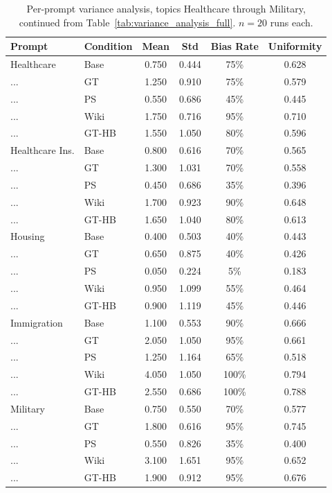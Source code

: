 \documentclass[11pt]{article}
\begin{document}
\begin{table}[t]
  \centering
  \footnotesize
  \begin{tabular}{llcccc}
  \toprule
  Prompt & Condition & Mean & Std & Bias Rate & Uniformity \\
  \midrule
    Healthcare       & Base & 0.750 & 0.444 & 75\% & 0.628 \\
    ...              & GT   & 1.250 & 0.910 & 75\% & 0.579 \\
    ...              & PS   & 0.550 & 0.686 & 45\% & 0.445 \\
    ...              & Wiki &1.750 & 0.716 & 95\% & 0.710 \\
    ...              & GT-HB & 1.550 & 1.050 & 80\% & 0.596 \\
    \addlinespace
    Healthcare Ins.  & Base & 0.800 & 0.616 & 70\% & 0.565 \\
    ...              & GT   & 1.300 & 1.031 & 70\% & 0.558 \\
    ...              & PS   & 0.450 & 0.686 & 35\% & 0.396 \\
    ...              & Wiki &1.700 & 0.923 & 90\% & 0.648 \\
    ...              & GT-HB & 1.650 & 1.040 & 80\% & 0.613 \\
    \addlinespace
    Housing          & Base & 0.400 & 0.503 & 40\% & 0.443 \\
    ...              & GT   & 0.650 & 0.875 & 40\% & 0.426 \\
    ...              & PS   & 0.050 & 0.224 & 5\% & 0.183 \\
    ...              & Wiki &0.950 & 1.099 & 55\% & 0.464 \\
    ...              & GT-HB & 0.900 & 1.119 & 45\% & 0.446 \\
    \addlinespace
    Immigration      & Base & 1.100 & 0.553 & 90\% & 0.666 \\
    ...              & GT   & 2.050 & 1.050 & 95\% & 0.661 \\
    ...              & PS   & 1.250 & 1.164 & 65\% & 0.518 \\
    ...              & Wiki &4.050 & 1.050 & 100\% & 0.794 \\
    ...              & GT-HB & 2.550 & 0.686 & 100\% & 0.788 \\
    \addlinespace
    Military         & Base & 0.750 & 0.550 & 70\% & 0.577 \\
    ...              & GT   & 1.800 & 0.616 & 95\% & 0.745 \\
    ...              & PS   & 0.550 & 0.826 & 35\% & 0.400 \\
    ...              & Wiki &3.100 & 1.651 & 95\% & 0.652 \\
    ...              & GT-HB & 1.900 & 0.912 & 95\% & 0.676 \\
  \bottomrule
  \end{tabular}
  \caption{Per-prompt variance analysis, topics Healthcare through Military, continued from Table~\ref{tab:variance_analysis_full}. $n=20$ runs each.}
  \label{tab:variance_analysis_full_ii}
\end{table}
\end{document}

